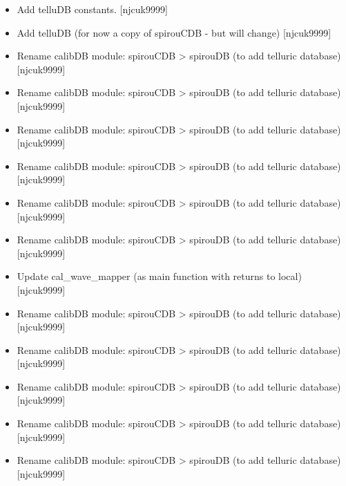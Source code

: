 \documentclass[a4paper,10pt,english]{report}
\begin{document}
\begin{itemize}
\item {} 
Add telluDB constants. {[}njcuk9999{]}

\item {} 
Add telluDB (for now a copy of spirouCDB - but will change)
{[}njcuk9999{]}

\item {} 
Rename calibDB module: spirouCDB \textendash{}\textgreater{} spirouDB (to add telluric
database) {[}njcuk9999{]}

\item {} 
Rename calibDB module: spirouCDB \textendash{}\textgreater{} spirouDB (to add telluric
database) {[}njcuk9999{]}

\item {} 
Rename calibDB module: spirouCDB \textendash{}\textgreater{} spirouDB (to add telluric
database) {[}njcuk9999{]}

\item {} 
Rename calibDB module: spirouCDB \textendash{}\textgreater{} spirouDB (to add telluric
database) {[}njcuk9999{]}

\item {} 
Rename calibDB module: spirouCDB \textendash{}\textgreater{} spirouDB (to add telluric
database) {[}njcuk9999{]}

\item {} 
Rename calibDB module: spirouCDB \textendash{}\textgreater{} spirouDB (to add telluric
database) {[}njcuk9999{]}

\item {} 
Update cal\_wave\_mapper (as main function with returns to local)
{[}njcuk9999{]}

\item {} 
Rename calibDB module: spirouCDB \textendash{}\textgreater{} spirouDB (to add telluric
database) {[}njcuk9999{]}

\item {} 
Rename calibDB module: spirouCDB \textendash{}\textgreater{} spirouDB (to add telluric
database) {[}njcuk9999{]}

\item {} 
Rename calibDB module: spirouCDB \textendash{}\textgreater{} spirouDB (to add telluric
database) {[}njcuk9999{]}

\item {} 
Rename calibDB module: spirouCDB \textendash{}\textgreater{} spirouDB (to add telluric
database) {[}njcuk9999{]}

\item {} 
Rename calibDB module: spirouCDB \textendash{}\textgreater{} spirouDB (to add telluric
database) {[}njcuk9999{]}


\end{itemize}
\end{document}
